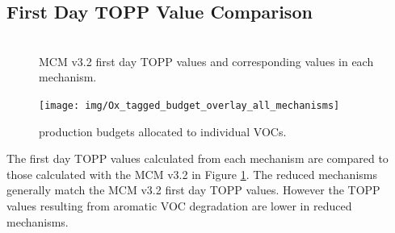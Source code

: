 
\subsection{First Day TOPP Value Comparison} \label{ss:day1} %

\begin{figure}
    \centering
    \includegraphics[width=\textwidth]{img/first_day_values}
    \vspace{0mm}
    \caption{MCM v3.2 first day TOPP values and corresponding values in each mechanism.}
    \vspace{-4mm}
    \label{f:first_day}
\end{figure}

\begin{figure}
    \centering
    \texttt{[image: img/Ox\_tagged\_budget\_overlay\_all\_mechanisms]}
    \vspace{0mm}
    \caption{ production budgets allocated to individual VOCs.}
    \vspace{-4mm}
    \label{f:Ox_tagged_budgets}
\end{figure}

The first day TOPP values calculated from each mechanism are compared to those calculated with the MCM v3.{2} in Figure \ref{f:first_day}. 
The reduced mechanisms generally match the MCM v3.2 first day TOPP values. 
However the TOPP values resulting from aromatic VOC degradation are lower in reduced mechanisms.

